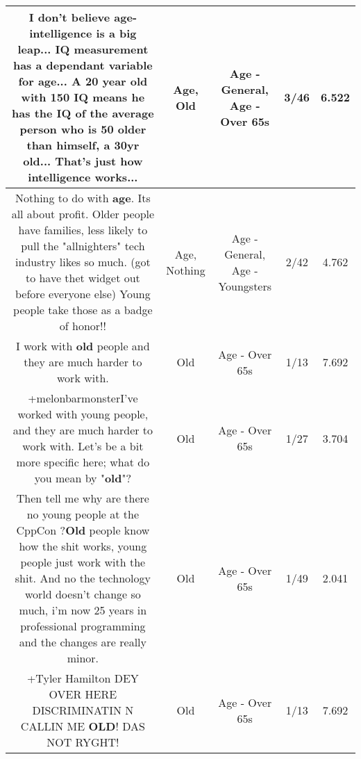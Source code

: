 \documentclass[11pt]{article}
\newlength\mylength
\begin{document}
\begin{center}
\begin{longtable}{|C{.65\mylength}|C{.30\mylength}|C{.12\mylength}|C{.12\mylength}|C{.12\mylength}|}
  \small I don't believe \textbf{age}-intelligence is a big leap... IQ measurement has a dependant variable for \textbf{age}... A 20 year \textbf{old} with 150 IQ means he has the IQ of the average person who is 50 older than himself, a 30yr \textbf{old}... That's just how intelligence works...\normalsize   & Age, Old & Age - General, Age - Over 65s & 3/46 & 6.522 \\  \hline
  \small Nothing to do with \textbf{age}. Its all about profit. Older people have families, less likely to pull the "allnighters" tech industry likes so much. (got to have thet widget out before everyone else) Young people take those as a badge of honor!!\normalsize   & Age, Nothing & Age - General, Age - Youngsters & 2/42 & 4.762 \\  \hline
  \small I work with \textbf{old} people and they are much harder to work with.\normalsize   & Old & Age - Over 65s & 1/13 & 7.692 \\  \hline
  \small +melonbarmonsterI've worked with young people, and they are much harder to work with. Let's be a bit more specific here; what do you mean by "\textbf{old}"?\normalsize   & Old & Age - Over 65s & 1/27 & 3.704 \\  \hline
  \small Then tell me why are there no young people at the CppCon ?\textbf{Old} people know how the shit works, young people just work with the shit. And no the technology world doesn't change so much, i'm now 25 years in professional programming and the changes are really minor.\normalsize   & Old & Age - Over 65s & 1/49 & 2.041 \\  \hline
  \small +Tyler Hamilton   DEY OVER HERE DISCRIMINATIN N CALLIN ME \textbf{OLD}! DAS NOT RYGHT!\normalsize   & Old & Age - Over 65s & 1/13 & 7.692 \\  \hline

\end{longtable}
\end{center}
\end{document}
